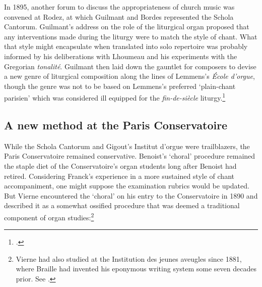 In 1895, another forum to discuss the appropriateness of church music was convened at Rodez, at which Guilmant and Bordes represented the Schola Cantorum.
Guilmant's address on the role of the liturgical organ proposed that any interventions made during the liturgy were to match the style of chant.
What that style might encapsulate when translated into solo repertoire was probably informed by his deliberations with Lhoumeau and his experiments with the Gregorian \emph{tonalité}.
Guilmant then laid down the gauntlet for composers to devise a new genre of liturgical composition along the lines of Lemmens's \emph{École d'orgue}, though the genre was not to be based on Lemmens's preferred `plain-chant parisien' which was considered ill equipped for the \emph{fin-de-siècle} liturgy.\footcite[The first volume of \emph{La Tribune de Saint-Gervais} restarted each issue's pagination. Only from the second volume did the pagination run contiguously][11]{Guilmantroleorguedans1895}

\subsection{A new method at the Paris Conservatoire}
While the Schola Cantorum and Gigout's Institut d'orgue were trailblazers, the Paris Conservatoire remained conservative.
Benoist's `choral' procedure remained the staple diet of the Conservatoire's organ students long after Benoist had retired.
Considering Franck's \mbox{experience} in a more sustained style of chant accompaniment, one might suppose the examination rubrics would be updated.
\label{sc:vierne_choral}%
But Vierne encountered the `choral' on his entry to the Conservatoire in 1890 and described it as a somewhat ossified procedure that was deemed a traditional component of organ studies:\footnote{Vierne had also studied at the Institution des jeunes aveugles since 1881, where Braille had invented his eponymous writing system some seven decades prior. See \cite[430]{AprahamianLouisVierne187019371970}.}

